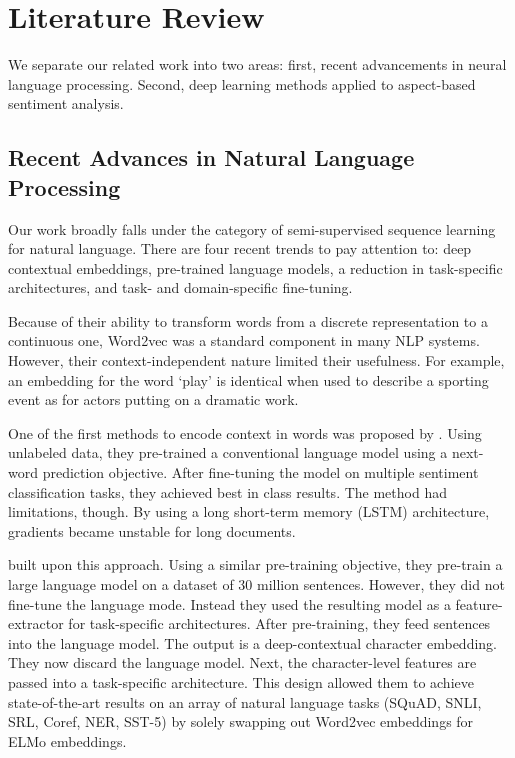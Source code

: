 \documentclass[11pt,a4paper,titlepage]{article}
\begin{document}





\section{Literature Review}

We separate our related work into two areas: first, recent advancements in neural language processing. Second, deep learning methods applied to aspect-based sentiment analysis.

\subsection{Recent Advances in Natural Language Processing}




Our work broadly falls under the category of semi-supervised sequence learning for natural language. There are four recent trends to pay attention to: deep contextual embeddings, pre-trained language models, a reduction in task-specific architectures, and task- and domain-specific fine-tuning.

Because of their ability to transform words from a discrete representation to a continuous one, Word2vec \citep{mikolov2013efficient} was a standard component in many NLP systems. However, their context-independent nature limited their usefulness. For example, an embedding for the word ‘play’ is identical when used to describe a sporting event as for actors putting on a dramatic work.

One of the first methods to encode context in words was proposed by \cite{dai2015semisupervised}. Using unlabeled data, they pre-trained a conventional language model using a next-word prediction objective. After fine-tuning the model on multiple sentiment classification tasks, they achieved best in class results. The method had limitations, though. By using a long short-term memory (LSTM) architecture, gradients became unstable for long documents.

\cite{peters2018deep} built upon this approach. Using a similar pre-training objective, they pre-train a large language model on a dataset of 30 million sentences. However, they did not fine-tune the language mode. Instead they used the resulting model as a feature-extractor for task-specific architectures. After pre-training, they feed sentences into the language model. The output is a deep-contextual character embedding. They now discard the language model. Next, the character-level features are passed into a task-specific architecture. This design allowed them to achieve state-of-the-art results on an array of natural language tasks (SQuAD, SNLI, SRL, Coref, NER, SST-5) by solely swapping out Word2vec embeddings for ELMo embeddings.
\end{document}
